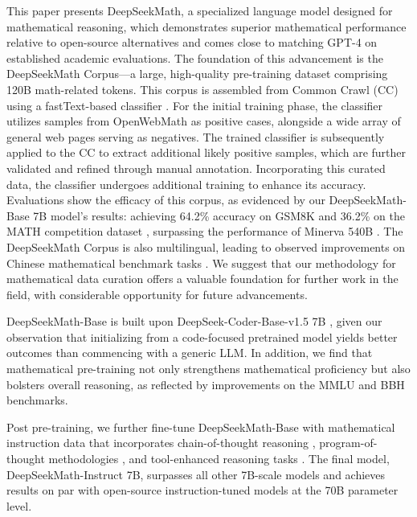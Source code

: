 This paper presents DeepSeekMath, a specialized language model designed for mathematical reasoning, which demonstrates superior mathematical performance relative to open-source alternatives and comes close to matching GPT-4 on established academic evaluations. The foundation of this advancement is the DeepSeekMath Corpus—a large, high-quality pre-training dataset comprising 120B math-related tokens. This corpus is assembled from Common Crawl (CC) using a fastText-based classifier \citep{joulin2016fasttext}. For the initial training phase, the classifier utilizes samples from OpenWebMath \citep{openwebmath} as positive cases, alongside a wide array of general web pages serving as negatives. The trained classifier is subsequently applied to the CC to extract additional likely positive samples, which are further validated and refined through manual annotation. Incorporating this curated data, the classifier undergoes additional training to enhance its accuracy. Evaluations show the efficacy of this corpus, as evidenced by our DeepSeekMath-Base 7B model’s results: achieving 64.2\% accuracy on GSM8K \citep{gsm8k} and 36.2\% on the MATH competition dataset \citep{MATH}, surpassing the performance of Minerva 540B \citep{minerva}. The DeepSeekMath Corpus is also multilingual, leading to observed improvements on Chinese mathematical benchmark tasks \citep{wei2023cmath,agieval}. We suggest that our methodology for mathematical data curation offers a valuable foundation for further work in the field, with considerable opportunity for future advancements.

DeepSeekMath-Base is built upon DeepSeek-Coder-Base-v1.5 7B \citep{deepseek-coder}, given our observation that initializing from a code-focused pretrained model yields better outcomes than commencing with a generic LLM. In addition, we find that mathematical pre-training not only strengthens mathematical proficiency but also bolsters overall reasoning, as reflected by improvements on the MMLU \citep{mmlu} and BBH \citep{bbh} benchmarks.

Post pre-training, we further fine-tune DeepSeekMath-Base with mathematical instruction data that incorporates chain-of-thought reasoning \citep{cot}, program-of-thought methodologies \citep{pot,pal}, and tool-enhanced reasoning tasks \citep{tora}. The final model, DeepSeekMath-Instruct 7B, surpasses all other 7B-scale models and achieves results on par with open-source instruction-tuned models at the 70B parameter level.

